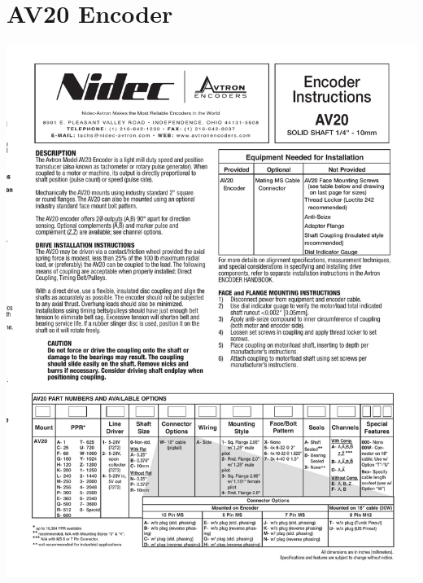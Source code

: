 \section{AV20 Encoder}
\begin{center}
	\includegraphics[width=5.5in]{afiles/FX1.pdf}
	\label{av20:1} %
\end{center}
